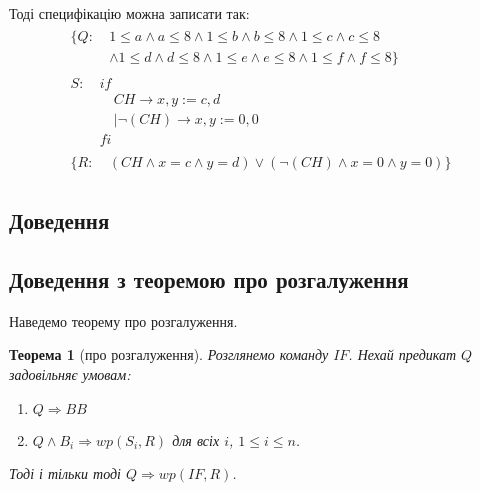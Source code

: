 \documentclass[14pt,a4paper]{extarticle}
\newtheorem{theorem}{Теорема}[section]
\theoremstyle{definition}
\begin{document}
Тоді специфікацію можна записати так:
\begin{align*}
  \begin{split}
    \{Q:\ & 1 \leq a \land a \leq 8 \land 1 \leq b \land b \leq 8 \land 1 \leq c
    \land c \leq 8 \\& \land 1 \leq d \land d \leq 8
    \land 1 \leq e \land e \leq 8 \land 1 \leq f \land f \leq 8\}
  \end{split}\\
  \begin{split}
    S:\ & if\\
    &\quad CH \to x,y := c,d \\
    &\quad|\lnot(CH) \to x,y := 0,0 \\
    &fi
  \end{split}\\
  \begin{split}
    \{R:\ & (CH \land x = c \land y = d)
    \lor (\lnot(CH) \land x = 0 \land y = 0)\}
  \end{split}
\end{align*}


\subsection{Доведення}

\subsection{Доведення з теоремою про розгалуження}
Наведемо теорему про розгалуження.
\begin{theorem}[про розгалуження]
  Розглянемо команду $IF$.
  Нехай предикат $Q$ задовільняє умовам:
  \begin{enumerate}
    \item $Q \Rightarrow BB$
    \item $Q \land B_i \Rightarrow \mathit{wp}(S_i, R)$ для всіх $i$,
    $1 \leq i \leq n$.
  \end{enumerate}
  Тоді і тільки тоді $Q \Rightarrow \mathit{wp}(IF, R)$.
\end{theorem}
\end{document}
